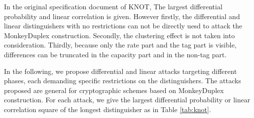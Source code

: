 In the original specification document of KNOT, The largest differential probability and linear correlation is given. However firstly, the differential and linear distinguishers with no restrictions can not be directly uesd to attack the MonkeyDuplex construction. Secondly, the clustering effect is not taken into consideration. Thirdly, because only the rate part and the tag part is visible, differences can be truncated in the capacity part and in the non-tag part. 

In the following, we propose differential and linear attacks targeting different phases, each demanding specific restrictions on the distinguishers. The attacks proposed are general for cryptographic schemes based on MonkeyDuplex construction. For each attack, we give the largest differential probability or linear correlation square of the longest distinguisher as in Table \ref{tab:knot}. 

